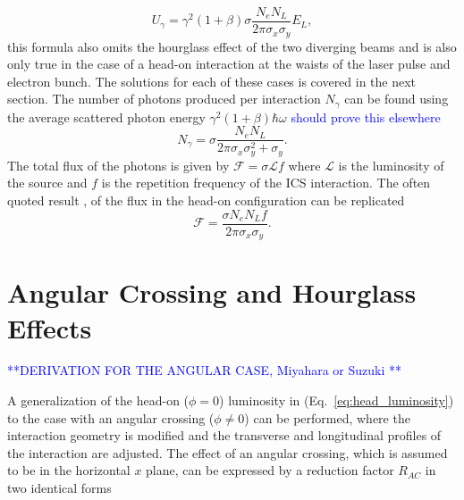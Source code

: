 \documentclass[../main.tex]{subfiles}
\begin{document}
\begin{equation}
U_{\gamma} = \gamma^{2}\left(1+\beta\right)\sigma\frac{N_{e}N_{L}}{2\pi\sigma_{x}\sigma_{y}}E_{L},
\label{eq:total_interaction_energy_simplified}
\end{equation}
this formula also omits the hourglass effect of the two diverging beams and is also only true in the case of a head-on interaction at the waists of the laser pulse and electron bunch. The solutions for each of these cases is covered in the next section. The number of photons produced per interaction $N_{\gamma}$ can be found using the average scattered photon energy $\gamma^{2}\left(1+\beta\right)\hbar\omega$ \textcolor{blue}{should prove this elsewhere}
\begin{equation}
N_{\gamma} = \sigma\frac{N_{e}N_{L}}{2\pi\sigma_{x}\sigma_{y}^{2}+\sigma_{y}}.
\label{eq:no_photon_headon}
\end{equation}
The total flux of the photons is given by $\mathcal{F} = \sigma\mathcal{L}f$ where $\mathcal{L}$ is the luminosity of the source and $f$ is the repetition frequency of the ICS interaction. The often quoted result \cite{krafft2010compton,curatolo2017analytical}, of the flux in the head-on configuration can be replicated
\begin{equation}
\mathcal{F} = \frac{\sigma N_{e}N_{L}f}{2\pi\sigma_{x}\sigma_{y}}.
\label{eq:headon_flux}
\end{equation}

\section{Angular Crossing and Hourglass Effects}
\label{sec:angular_crossing_and_hourglass_effects}
\textcolor{blue}{**DERIVATION FOR THE ANGULAR CASE, Miyahara \cite{miyahara2008luminosity} or Suzuki \cite{suzuki1976general}**}

A generalization of the head-on ($\phi = 0$) luminosity in (Eq.~\ref{eq:head_luminosity}) to the case with an angular crossing ($\phi \neq 0$) can be performed, where the interaction geometry is modified and the transverse and longitudinal profiles of the interaction are adjusted. The effect of an angular crossing, which is assumed to be in the horizontal $x$ plane, can be expressed by a reduction factor $R_{AC}$ in two identical forms \cite{suzuki1976general,miyahara2008luminosity}
\end{document}
